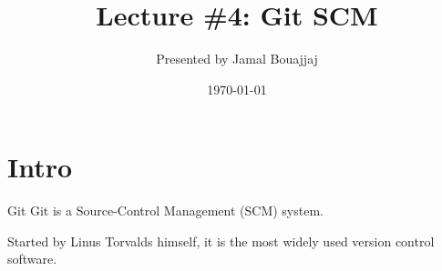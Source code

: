%
%



\title{Lecture \#4: Git SCM}
\date{\today}
\author{Presented by Jamal Bouajjaj}

\makeatletter
{}%
\makeatother

\renewcommand{\footnoterule}{}


\newcommand{\Imgsource}[1]{%
    \setbeamertemplate{footnote}[unnumbered]%
    \footnotetext{Image Source: \url{#1}}%
}



\maketitle

\section{Intro}

\begin{frame}{Git}
  Git is a Source-Control Management (SCM) system.

  Started by Linus Torvalds himself, it is the most widely used version control software.
\end{frame}

